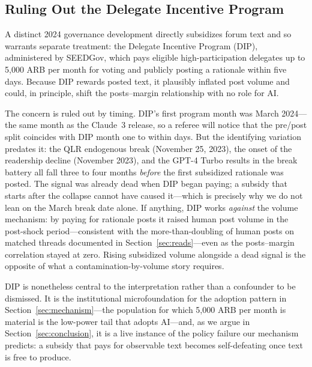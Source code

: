 \documentclass[12pt]{article}
\begin{document}



\subsection{Ruling Out the Delegate Incentive Program}
\label{sec:dip}

A distinct 2024 governance development directly subsidizes forum text and so
warrants separate treatment: the Delegate Incentive Program (DIP), administered by
SEEDGov, which pays eligible high-participation delegates up to 5{,}000 ARB per
month for voting and publicly posting a rationale within five days.
Because DIP rewards posted text, it plausibly inflated post volume and could, in
principle, shift the posts--margin relationship with no role for AI.

The concern is ruled out by timing. DIP's first program month was March 2024---the
same month as the Claude~3 release, so a referee will notice that the pre/post split
coincides with DIP month one to within days. But the identifying variation predates
it: the QLR endogenous break (November 25, 2023), the onset of the readership decline
(November 2023), and the GPT-4 Turbo results in the break battery all fall three to
four months \emph{before} the first subsidized rationale was posted. The signal was
already dead when DIP began paying; a subsidy that starts after the collapse cannot
have caused it---which is precisely why we do not lean on the March break date alone. If anything, DIP works \emph{against} the volume
mechanism: by paying for rationale posts it raised human post volume in the
post-shock period---consistent with the more-than-doubling of human posts on
matched threads documented in Section~\ref{sec:reads}---even as the posts--margin
correlation stayed at zero. Rising subsidized volume alongside a dead signal is the
opposite of what a contamination-by-volume story requires.

DIP is nonetheless central to the interpretation rather than a confounder to be
dismissed. It is the institutional microfoundation for the adoption pattern in
Section~\ref{sec:mechanism}---the population for which 5{,}000 ARB per month is
material is the low-power tail that adopts AI---and, as we argue in
Section~\ref{sec:conclusion}, it is a live instance of the policy failure our
mechanism predicts: a subsidy that pays for observable text becomes self-defeating
once text is free to produce.
\end{document}
